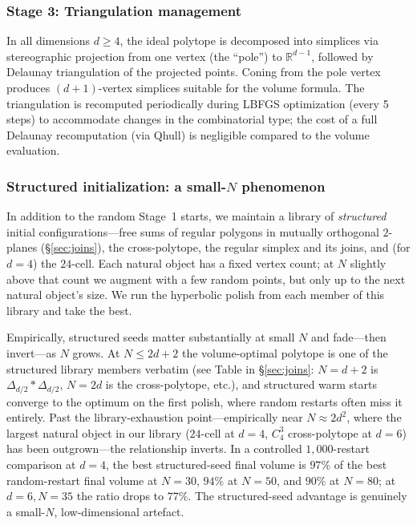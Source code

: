 \documentclass[11pt]{article}
\begin{document}
\subsubsection{Stage 3: Triangulation management}

In all dimensions $d \geq 4$, the ideal polytope is decomposed
into simplices via stereographic projection from one vertex
(the ``pole'') to $\mathbb{R}^{d-1}$, followed by Delaunay
triangulation of the projected points.  Coning from the pole
vertex produces $(d+1)$-vertex simplices suitable for the volume
formula.  The triangulation is recomputed periodically during
LBFGS optimization (every 5 steps) to accommodate changes in
the combinatorial type; the cost of a full Delaunay recomputation
(via Qhull) is negligible compared to the volume evaluation.

\subsubsection{Structured initialization: a small-$N$ phenomenon}
\label{sec:structured-seeds}

In addition to the random Stage~1 starts, we maintain a library
of \emph{structured} initial configurations---free sums of regular
polygons in mutually orthogonal $2$-planes
(\S\ref{sec:joins}), the cross-polytope, the regular simplex and
its joins, and (for $d = 4$) the $24$-cell.  Each natural object
has a fixed vertex count; at $N$ slightly above that count we
augment with a few random points, but only up to the next natural
object's size.  We run the hyperbolic polish from each member of
this library and take the best.

Empirically, structured seeds matter substantially at small $N$
and fade---then invert---as $N$ grows.  At $N \leq 2d + 2$ the
volume-optimal polytope is one of the structured library members
verbatim (see Table in \S\ref{sec:joins}: $N = d{+}2$ is
$\Delta_{d/2}{*}\Delta_{d/2}$, $N = 2d$ is the cross-polytope, etc.),
and structured warm starts converge to the optimum on the first
polish, where random restarts often miss it entirely.  Past the
library-exhaustion point---empirically near $N \approx 2d^2$,
where the largest natural object in our library
($24$-cell at $d = 4$, $C_4^3$ cross-polytope at $d = 6$) has
been outgrown---the relationship inverts.  In a controlled
$1{,}000$-restart comparison at $d = 4$, the best structured-seed
final volume is $97\%$ of the best random-restart final volume at
$N = 30$, $94\%$ at $N = 50$, and $90\%$ at $N = 80$; at
$d = 6, N = 35$ the ratio drops to $77\%$.  The structured-seed
advantage is genuinely a small-$N$, low-dimensional artefact.
\end{document}
